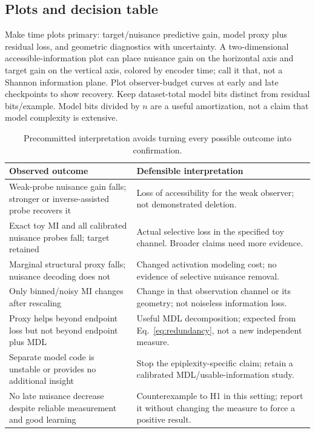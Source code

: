 \documentclass[11pt,a4paper]{article}
\begin{document}
\subsection{Plots and decision table}
Make time plots primary: target/nuisance predictive gain, model proxy plus residual loss, and geometric diagnostics with uncertainty. A two-dimensional accessible-information plot can place nuisance gain on the horizontal axis and target gain on the vertical axis, colored by encoder time; call it that, not a Shannon information plane. Plot observer-budget curves at early and late checkpoints to show recovery. Keep dataset-total model bits distinct from residual bits/example. Model bits divided by $n$ are a useful amortization, not a claim that model complexity is extensive.

\begin{table}[htbp]
\small
\begin{tabularx}{\linewidth}{@{}LL@{}}
\toprule
Observed outcome & Defensible interpretation\\
\midrule
Weak-probe nuisance gain falls; stronger or inverse-assisted probe recovers it & Loss of accessibility for the weak observer; not demonstrated deletion.\\
Exact toy MI and all calibrated nuisance probes fall; target retained & Actual selective loss in the specified toy channel. Broader claims need more evidence.\\
Marginal structural proxy falls; nuisance decoding does not & Changed activation modeling cost; no evidence of selective nuisance removal.\\
Only binned/noisy MI changes after rescaling & Change in that observation channel or its geometry; not noiseless information loss.\\
Proxy helps beyond endpoint loss but not beyond endpoint plus MDL & Useful MDL decomposition; expected from Eq.~\eqref{eq:redundancy}, not a new independent measure.\\
Separate model code is unstable or provides no additional insight & Stop the epiplexity-specific claim; retain a calibrated MDL/usable-information study.\\
No late nuisance decrease despite reliable measurement and good learning & Counterexample to H1 in this setting; report it without changing the measure to force a positive result.\\
\bottomrule
\end{tabularx}
\caption{Precommitted interpretation avoids turning every possible outcome into confirmation.}
\end{table}
\end{document}
